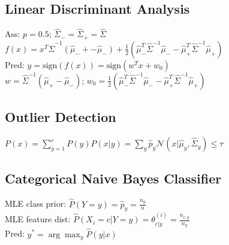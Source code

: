 \subsection*{Linear Discriminant Analysis}
Ass: $p = 0.5$;   $\hat{\Sigma}_- = \hat{\Sigma}_+ = \hat{\Sigma}$\\
$f(x) = x^T\hat{\Sigma}^{-1}(\hat{\mu}_-+-\hat{\mu}_-)+
\frac{1}{2}(\hat{\mu}_-^T\hat{\Sigma}^{-1}\hat{\mu}_- - \hat{\mu}_+^T \hat{\Sigma}^{-1}\hat{\mu}_+  )$\\
Pred: $y = \text{sign}(f(x)) = \text{sign} (w^T x + w_0)$\\
$w = \hat{\Sigma}^{-1}(\hat{\mu}_+ - \hat{\mu}_-)$; $w_0 = \frac{1}{2}(\hat{\mu}_-^T\hat{\Sigma}^{-1}\hat{\mu}_- - \hat{\mu}_+^T \hat{\Sigma}^{-1}\hat{\mu}_+)$

\subsection*{Outlier Detection}
$P(x) = \sum_{y=1}^c P(y) P(x|y) = \sum_y \hat{p}_y \mathcal{N}(x|\hat{\mu}_y,\hat{\Sigma}_y) \leq \tau$

\subsection*{Categorical Naive Bayes Classifier}
MLE class prior: $\hat{P}(Y=y) = \hat{p}_y=\frac{n_y}{n}$\\
MLE feature dist: $\hat{P}(X_i = c|Y = y) = \theta_{c|y}^{(i)} = \frac{n_{c,y}}{n_y}$\\
Pred: $y^* = \arg\max_{y}\hat{P}(y|x)$


